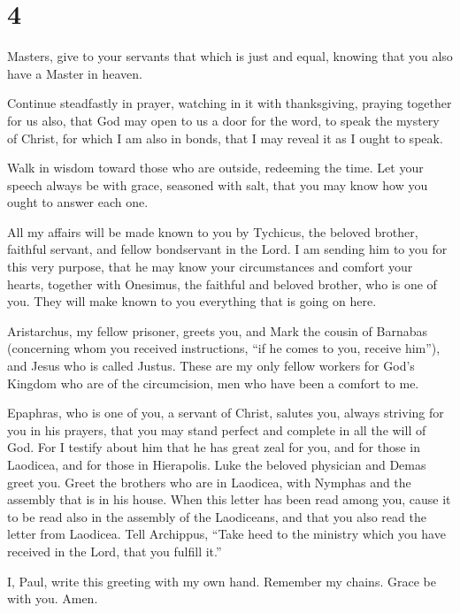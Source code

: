 \hypertarget{section-3}{%
\section{4}\label{section-3}}

 Masters, give to your servants that which is just and
equal, knowing that you also have a Master in heaven.

 Continue steadfastly in prayer, watching in it with
thanksgiving,  praying together for us also, that God may
open to us a door for the word, to speak the mystery of Christ, for
which I am also in bonds,  that I may reveal it as I ought
to speak.

 Walk in wisdom toward those who are outside, redeeming
the time.  Let your speech always be with grace, seasoned
with salt, that you may know how you ought to answer each one.

 All my affairs will be made known to you by Tychicus, the
beloved brother, faithful servant, and fellow bondservant in the Lord.
 I am sending him to you for this very purpose, that he
may know your circumstances and comfort your hearts, 
together with Onesimus, the faithful and beloved brother, who is one of
you. They will make known to you everything that is going on here.

 Aristarchus, my fellow prisoner, greets you, and Mark
the cousin of Barnabas (concerning whom you received instructions, ``if
he comes to you, receive him''),  and Jesus who is called
Justus. These are my only fellow workers for God's Kingdom who are of
the circumcision, men who have been a comfort to me.

 Epaphras, who is one of you, a servant of Christ,
salutes you, always striving for you in his prayers, that you may stand
perfect and complete in all the will of God.  For I
testify about him that he has great zeal for you, and for those in
Laodicea, and for those in Hierapolis.  Luke the beloved
physician and Demas greet you.  Greet the brothers who
are in Laodicea, with Nymphas and the assembly that is in his house.
 When this letter has been read among you, cause it to be
read also in the assembly of the Laodiceans, and that you also read the
letter from Laodicea.  Tell Archippus, ``Take heed to the
ministry which you have received in the Lord, that you fulfill it.''

 I, Paul, write this greeting with my own hand. Remember
my chains. Grace be with you. Amen.
